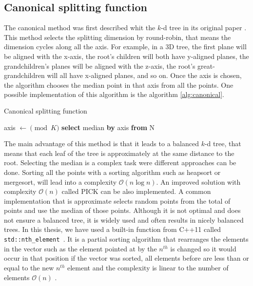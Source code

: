 \subsection{Canonical splitting function}
The canonical method was first described whit the $k$-d tree in its original paper \cite{Bentley}. This method selects the splitting dimension by round-robin, that means the dimension cycles along all the axis. For example, in a 3D tree, the first plane will be aligned with the x-axis, the root's children will both have y-aligned planes, the grandchildren's planes will be aligned with the z-axis, the root's great-grandchildren will all have x-aligned planes, and so on. Once the axis is chosen, the algorithm chooses the median point in that axis from all the points. One possible implementation of this algorithm is the algorithm \ref{alg:canonical}.
\begin{algorithm}[h!]
    \caption{Canonical splitting function
        \label{alg:canonical}}
    \begin{algorithmic}[1]
    \Statex
        \State axis $\gets \pmod{K}$ 
        \State \textbf{select} median \textbf{by} axis \textbf{from} N
        \State {}
    \EndFunction
    \end{algorithmic}
\end{algorithm}

The main advantage of this method is that it leads to a balanced $k$-d tree, that means that each leaf of the tree is approximately at the same distance to the root. Selecting the median is a complex task were different approaches can be done. Sorting all the points with a sorting algorithm such as heapsort or mergesort, will lead into a complexity $\mathcal{O}(n\log{}n)$. An improved solution with complexity $\mathcal{O}(n)$ called PICK \cite{BLUM1973448} can be also implemented. A common implementation that is approximate selects random points from the total of points and use the median of those points. Although it is not optimal and does not ensure a balanced tree, it is widely used and often results in nicely balanced trees. In this thesis, we have used a built-in function from C++11 called \texttt{ std::nth_element }. It is a partial sorting algorithm that rearranges the elements in the vector such as the element pointed at by the $n^{th}$ is changed so it would occur in that position if the vector was sorted, all elements before are less than or equal to the new $n^{th}$ element and the complexity is linear to the number of elements $\mathcal{O}(n)$ \cite{C++11iso}.

